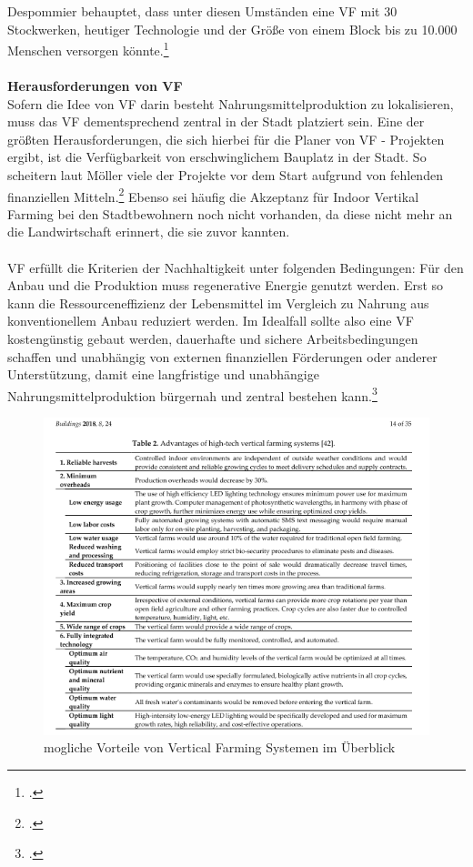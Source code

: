 \documentclass{scrartcl}
\begin{document}
Despommier behauptet, dass unter diesen Umständen eine VF mit 30 Stockwerken, heutiger Technologie und der Größe von einem Block bis zu 10.000 Menschen versorgen könnte.\footcite{Despommier2010TheCentury.}\\
\\


\textbf{Herausforderungen von VF}\\
Sofern die Idee von VF darin besteht Nahrungsmittelproduktion zu lokalisieren, muss das VF dementsprechend zentral in der Stadt platziert sein. Eine der größten Herausforderungen, die sich hierbei für die Planer von VF - Projekten ergibt, ist die Verfügbarkeit von erschwinglichem Bauplatz in der Stadt. So scheitern laut Möller viele der Projekte vor dem Start aufgrund von fehlenden finanziellen Mitteln.\footcite[S.8]{PeterMollerVoss2013VerticalRise} Ebenso sei häufig die Akzeptanz für Indoor Vertikal Farming bei den Stadtbewohnern noch nicht vorhanden, da diese nicht mehr an die Landwirtschaft erinnert, die sie zuvor kannten.\\
\\

VF erfüllt die Kriterien der Nachhaltigkeit unter folgenden Bedingungen:
Für den Anbau und die Produktion muss regenerative Energie genutzt werden. Erst so kann die Ressourceneffizienz der Lebensmittel im Vergleich zu Nahrung aus konventionellem Anbau reduziert werden. 
Im Idealfall sollte also eine VF kostengünstig gebaut werden, dauerhafte und sichere Arbeitsbedingungen schaffen und unabhängig von externen finanziellen Förderungen oder anderer Unterstützung, damit eine langfristige und unabhängige Nahrungsmittelproduktion bürgernah und zentral bestehen kann.\footcite{Despommier2010TheCentury.}


\begin{figure}[htbp]
\centering
\includegraphics[width=14cm]{image_folder/moglicheVorteileVonVF.png}
\caption{mogliche Vorteile von Vertical Farming Systemen im Überblick}
\label{fig:vorteileVF}
\end{figure}
\end{document}
